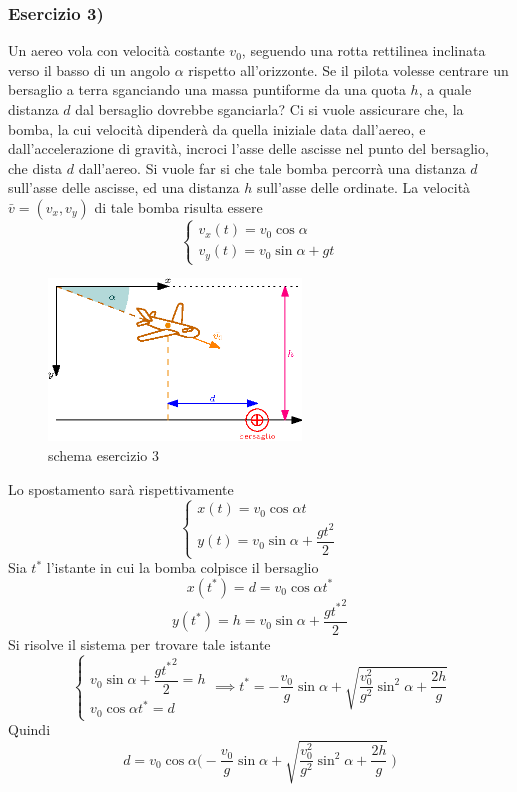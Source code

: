 \documentclass[10pt, letterpaper]{report}
\begin{document}
\subsubsection{Esercizio 3)}
Un aereo vola con velocità costante $v_0$, seguendo una rotta rettilinea inclinata verso
 il basso di un angolo $\alpha$ rispetto all'orizzonte. Se il pilota volesse
  centrare un bersaglio a terra sganciando una massa puntiforme da una quota $h$,
   a quale distanza $d$ dal bersaglio dovrebbe sganciarla?\acc
Ci si vuole assicurare che, la bomba, la cui velocità dipenderà da quella iniziale data 
dall'aereo, e dall'accelerazione di gravità, incroci l'asse delle ascisse nel punto del bersaglio, che 
dista $d$ dall'aereo. Si vuole far si che tale bomba percorrà una distanza $d$ sull'asse delle ascisse, ed 
una distanza $h$ sull'asse delle ordinate. La velocità $\bar v=(v_x,v_y)$ di tale bomba risulta essere 
$$\begin{cases}
    v_x(t)=v_0\cos\alpha\\ 
    v_y(t)=v_0\sin\alpha+gt
\end{cases} $$
   \begin{figure}[h!]
    \centering
    \includegraphics[width=0.6\textwidth]{images/es3.eps}
    \caption{schema esercizio 3}
\end{figure}
Lo spostamento sarà rispettivamente 
$$ \begin{cases}
    x(t)=v_0\cos\alpha t\\ 
    y(t)= v_0\sin\alpha+\dfrac{gt^2}{2}
\end{cases}$$
Sia $t^*$ l'istante in cui la bomba colpisce il bersaglio 
$$ x(t^*)=d=v_0\cos\alpha t^*$$ 
$$ y(t^*)=h= v_0\sin\alpha+\frac{g{t^*}^2}{2}$$
Si risolve il sistema per trovare tale istante 
$$ \begin{cases}
    v_0\sin\alpha+\dfrac{g{t^*}^2}{2}=h\\ 
    v_0\cos\alpha t^*=d
\end{cases}\implies 
t^*=-\frac{v_0}{g}\sin\alpha+\sqrt{\frac{v_0^2}{g^2}\sin^2\alpha+\frac{2h}{g}}$$
Quindi 
$$ 
d=v_0\cos\alpha\Bigg(
    -\frac{v_0}{g}\sin\alpha+\sqrt{\frac{v_0^2}{g^2}\sin^2\alpha+\frac{2h}{g}}\     
\Bigg)
$$
\end{document}
